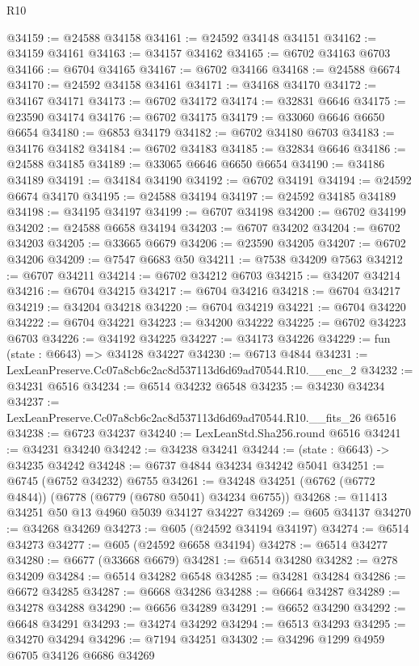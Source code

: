 \begin{lexlean}{R10}
\begin{coremodule}
@34159 := @24588 @34158
@34161 := @24592 @34148 @34151
@34162 := @34159 @34161
@34163 := @34157 @34162
@34165 := @6702 @34163 @6703
@34166 := @6704 @34165
@34167 := @6702 @34166
@34168 := @24588 @6674
@34170 := @24592 @34158 @34161
@34171 := @34168 @34170
@34172 := @34167 @34171
@34173 := @6702 @34172
@34174 := @32831 @6646
@34175 := @23590 @34174
@34176 := @6702 @34175
@34179 := @33060 @6646 @6650 @6654
@34180 := @6853 @34179
@34182 := @6702 @34180 @6703
@34183 := @34176 @34182
@34184 := @6702 @34183
@34185 := @32834 @6646
@34186 := @24588 @34185
@34189 := @33065 @6646 @6650 @6654
@34190 := @34186 @34189
@34191 := @34184 @34190
@34192 := @6702 @34191
@34194 := @24592 @6674 @34170
@34195 := @24588 @34194
@34197 := @24592 @34185 @34189
@34198 := @34195 @34197
@34199 := @6707 @34198
@34200 := @6702 @34199
@34202 := @24588 @6658 @34194
@34203 := @6707 @34202
@34204 := @6702 @34203
@34205 := @33665 @6679
@34206 := @23590 @34205
@34207 := @6702 @34206
@34209 := @7547 @6683 @50
@34211 := @7538 @34209 @7563
@34212 := @6707 @34211
@34214 := @6702 @34212 @6703
@34215 := @34207 @34214
@34216 := @6704 @34215
@34217 := @6704 @34216
@34218 := @6704 @34217
@34219 := @34204 @34218
@34220 := @6704 @34219
@34221 := @6704 @34220
@34222 := @6704 @34221
@34223 := @34200 @34222
@34225 := @6702 @34223 @6703
@34226 := @34192 @34225
@34227 := @34173 @34226
@34229 := fun (state : @6643) => @34128 @34227
@34230 := @6713 @4844
@34231 := LexLeanPreserve.Cc07a8cb6c2ac8d537113d6d69ad70544.R10.__enc_2
@34232 := @34231 @6516
@34234 := @6514 @34232 @6548
@34235 := @34230 @34234
@34237 := LexLeanPreserve.Cc07a8cb6c2ac8d537113d6d69ad70544.R10.__fits_26 @6516
@34238 := @6723 @34237
@34240 := LexLeanStd.Sha256.round @6516
@34241 := @34231 @34240
@34242 := @34238 @34241
@34244 := (state : @6643) -> @34235 @34242
@34248 := @6737 @4844 @34234 @34242 @5041
@34251 := @6745 (@6752 @34232) @6755
@34261 := @34248 @34251 (@6762 (@6772 @4844)) (@6778 (@6779 (@6780 @5041) @34234 @6755))
@34268 := @11413 @34251 @50 @13 @4960 @5039 @34127 @34227
@34269 := @605 @34137
@34270 := @34268 @34269
@34273 := @605 (@24592 @34194 @34197)
@34274 := @6514 @34273
@34277 := @605 (@24592 @6658 @34194)
@34278 := @6514 @34277
@34280 := @6677 (@33668 @6679)
@34281 := @6514 @34280
@34282 := @278 @34209
@34284 := @6514 @34282 @6548
@34285 := @34281 @34284
@34286 := @6672 @34285
@34287 := @6668 @34286
@34288 := @6664 @34287
@34289 := @34278 @34288
@34290 := @6656 @34289
@34291 := @6652 @34290
@34292 := @6648 @34291
@34293 := @34274 @34292
@34294 := @6513 @34293
@34295 := @34270 @34294
@34296 := @7194 @34251
@34302 := @34296 @1299 @4959 @6705 @34126 @6686 @34269

\end{coremodule}
\end{lexlean}
